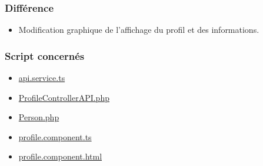 \subsubsection{Différence}
	\begin{itemize}
		\item Modification graphique de l'affichage du profil et des informations. 
	\end{itemize}

\vspace{\baselineskip}
\subsubsection{Script concernés}
	\begin{itemize}
		\item \href{https://github.com/victorsmits/Aquabike/blob/master/frontend/src/app/service/api.service.ts}{api.service.ts}
		\item \href{https://github.com/victorsmits/Aquabike/blob/master/backend/src/Controller/API/ProfileControllerAPI.php}{ProfileControllerAPI.php}
		\item \href{https://github.com/victorsmits/Aquabike/blob/master/backend/src/Entity/Person.php}{Person.php}
		\item \href{https://github.com/victorsmits/Aquabike/blob/master/frontend/src/app/profile/profile.component.ts}{profile.component.ts}
		\item \href{https://github.com/victorsmits/Aquabike/blob/master/frontend/src/app/profile/profile.component.html}{profile.component.html}
	\end{itemize}